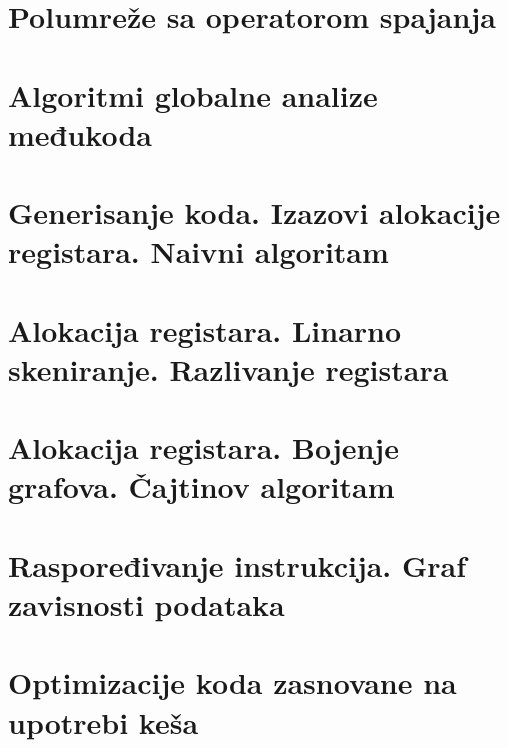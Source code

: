 \documentclass[10pt]{extarticle}
\begin{document}
\section{Polumreže sa operatorom spajanja}

\section{Algoritmi globalne analize međukoda}

\section{Generisanje koda. Izazovi alokacije registara. Naivni algoritam}

\section{Alokacija registara. Linarno skeniranje. Razlivanje registara}

\section{Alokacija registara. Bojenje grafova. Čajtinov algoritam}

\section{Raspoređivanje instrukcija. Graf zavisnosti podataka}

\section{Optimizacije koda zasnovane na upotrebi keša}
\end{document}
